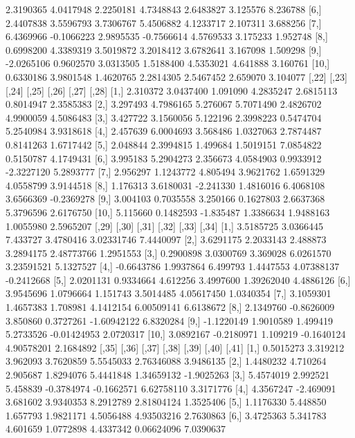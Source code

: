 \documentclass[12pt]{article}
\begin{document}
\begin{Schunk}
\begin{Soutput}
 [5,]  2.3190365  4.0417948 2.2250181  4.7348843  2.6483827 3.125576 8.236788
 [6,]  2.4407838  3.5596793 3.7306767  5.4506882  4.1233717 2.107311 3.688256
 [7,]  6.4369966 -0.1066223 2.9895535 -0.7566614  4.5769533 3.175233 1.952748
 [8,]  0.6998200  4.3389319 3.5019872  3.2018412  3.6782641 3.167098 1.509298
 [9,] -2.0265106  0.9602570 3.0313505  1.5188400  4.5353021 4.641888 3.160761
[10,]  0.6330186  3.9801548 1.4620765  2.2814305  2.5467452 2.659070 3.104077
         [,22]     [,23]     [,24]     [,25]     [,26]      [,27]      [,28]
 [1,] 2.310372 3.0437400  1.091090 4.2835247 2.6815113  0.8014947  2.3585383
 [2,] 3.297493 4.7986165  5.276067 5.7071490 2.4826702  4.9900059  4.5086483
 [3,] 3.427722 3.1560056  5.122196 2.3998223 0.5474704  5.2540984  3.9318618
 [4,] 2.457639 6.0004693  3.568486 1.0327063 2.7874487  0.8141263  1.6717442
 [5,] 2.048844 2.3994815  1.499684 1.5019151 7.0854822  0.5150787  4.1749431
 [6,] 3.995183 5.2904273  2.356673 4.0584903 0.9933912 -2.3227120  5.2893777
 [7,] 2.956297 1.1243772  4.805494 3.9621762 1.6591329  4.0558799  3.9144518
 [8,] 1.176313 3.6180031 -2.241330 1.4816016 6.4068108  3.6566369 -0.2369278
 [9,] 3.004103 0.7035558  3.250166 0.1627803 2.6637368  5.3796596  2.6176750
[10,] 5.115660 0.1482593 -1.835487 1.3386634 1.9488163  1.0055980  2.5965207
           [,29]      [,30]    [,31]      [,32]       [,33]      [,34]
 [1,]  3.5185725  3.0366445 7.433727  3.4780416  3.02331746  7.4440097
 [2,]  3.6291175  2.2033143 2.488873  3.2894175  2.48773766  1.2951553
 [3,]  0.2900898  3.0300769 3.369028  6.0261570  3.23591521  5.1327527
 [4,] -0.6643786  1.9937864 6.499793  1.4447553  4.07388137 -0.2412668
 [5,]  2.0201131  0.9334664 4.612256  3.4997600  1.39262040  4.4886126
 [6,]  3.9545696  1.0796664 1.151743  3.5014485  4.05617450  1.0340354
 [7,]  3.1059301  1.4657383 1.708981  4.1412154  6.00509141  6.6138672
 [8,]  2.1349760 -0.8626009 3.850860  0.3727261 -1.60942122  6.8320284
 [9,] -1.1220149  1.9010589 1.499419  5.2733526 -0.01424953  2.0720317
[10,]  3.0892167 -0.2180971 1.109219 -0.1640124  4.90578201  2.1684892
          [,35]     [,36]    [,37]      [,38]      [,39]       [,40]      [,41]
 [1,] 0.5015273  3.319212 3.962093  3.7620859  5.5545033  2.76346088  3.9486135
 [2,] 1.4480232  4.710264 2.905687  1.8294076  5.4441848  1.34659132 -1.9025263
 [3,] 5.4574019  2.992521 5.458839 -0.3784974 -0.1662571  6.62758110  3.3171776
 [4,] 4.3567247 -2.469091 3.681602  3.9340353  8.2912789  2.81804124  1.3525406
 [5,] 1.1176330  5.448850 1.657793  1.9821171  4.5056488  4.93503216  2.7630863
 [6,] 3.4725363  5.341783 4.601659  1.0772898  4.4337342  0.06624096  7.0390637

\end{Soutput}
\end{Schunk}
\end{document}
